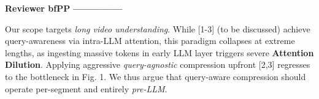 \vspace{-0.3em}
\noindent{\textcolor{MyOrange}{\Large\textbf{------------\quad}}}
\textcolor{MyOrange}{\textbf{Reviewer bfPP}} 
\textcolor{MyOrange}{\Large\textbf{\quad---------------}}

\vspace{-0.2em}
Our scope targets \textit{long video understanding}. While [1-3] (to be discussed) achieve query-awareness via intra-LLM attention, this paradigm collapses at extreme lengths, as ingesting massive tokens in early LLM layer triggers severe \textbf{Attention Dilution}. Applying aggressive \textit{query-agnostic} compression upfront [2,3] regresses to the bottleneck in Fig. 1. We thus argue that query-aware compression should operate per-segment and entirely \textit{pre-LLM}.


